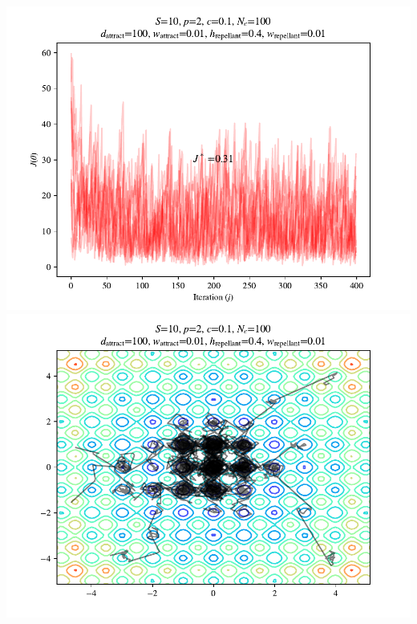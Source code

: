 \documentclass{beamer}
\begin{document}
\begin{frame}
\begin{columns}[T]
  \begin{center}
    \includegraphics[scale=0.3]{assets/rastrigin_colony_400_J}
    \includegraphics[scale=0.3]{assets/rastrigin_colony_400_theta}
  \end{center}
\end{columns}
\end{frame}
\end{document}
